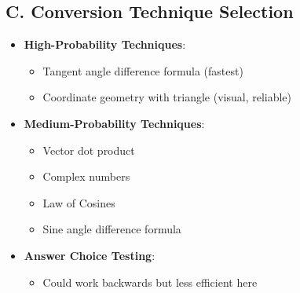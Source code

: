 \documentclass[12pt]{article}
\begin{document}
\begin{tacticalbox}
\subsection*{C. Conversion Technique Selection}
\begin{itemize}[leftmargin=*]
    \item \textbf{High-Probability Techniques}:
    \begin{itemize}
        \item Tangent angle difference formula (fastest)
        \item Coordinate geometry with triangle (visual, reliable)
    \end{itemize}
    \item \textbf{Medium-Probability Techniques}:
    \begin{itemize}
        \item Vector dot product
        \item Complex numbers
        \item Law of Cosines
        \item Sine angle difference formula
    \end{itemize}
    \item \textbf{Answer Choice Testing}:
    \begin{itemize}
        \item Could work backwards but less efficient here
    \end{itemize}
\end{itemize}
\end{tacticalbox}
\end{document}
